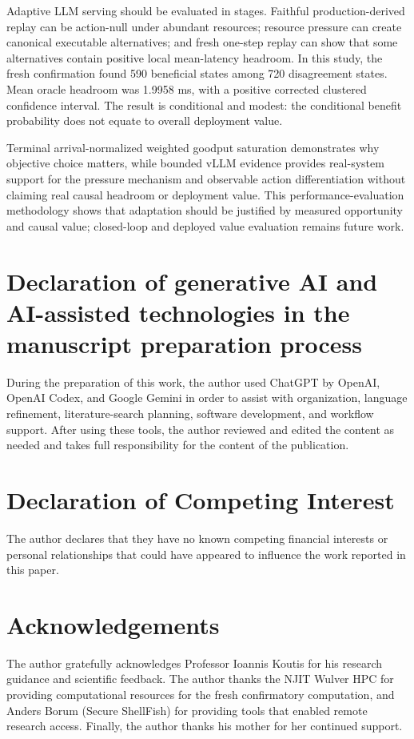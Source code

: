\documentclass[preprint,12pt]{elsarticle}
\begin{document}
Adaptive LLM serving should be evaluated in stages. Faithful production-derived replay can be action-null under abundant resources; resource pressure can create canonical executable alternatives; and fresh one-step replay can show that some alternatives contain positive local mean-latency headroom. In this study, the fresh confirmation found 590 beneficial states among 720 disagreement states. Mean oracle headroom was 1.9958 ms, with a positive corrected clustered confidence interval. The result is conditional and modest: the conditional benefit probability does not equate to overall deployment value.

Terminal arrival-normalized weighted goodput saturation demonstrates why objective choice matters, while bounded vLLM evidence provides real-system support for the pressure mechanism and observable action differentiation without claiming real causal headroom or deployment value. This performance-evaluation methodology shows that adaptation should be justified by measured opportunity and causal value; closed-loop and deployed value evaluation remains future work.

\section*{Declaration of generative AI and AI-assisted technologies in the manuscript preparation process}
During the preparation of this work, the author used ChatGPT by OpenAI, OpenAI Codex, and Google Gemini in order to assist with organization, language refinement, literature-search planning, software development, and workflow support. After using these tools, the author reviewed and edited the content as needed and takes full responsibility for the content of the publication.

\section*{Declaration of Competing Interest}
The author declares that they have no known competing financial interests or personal relationships that could have appeared to influence the work reported in this paper.

\section*{Acknowledgements}
The author gratefully acknowledges Professor Ioannis Koutis for his research guidance and scientific feedback. The author thanks the NJIT Wulver HPC for providing computational resources for the fresh confirmatory computation, and Anders Borum (Secure ShellFish) for providing tools that enabled remote research access. Finally, the author thanks his mother for her continued support.
\end{document}
